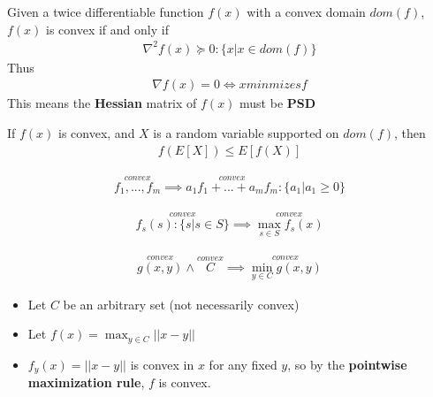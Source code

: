 \documentclass{article}
\begin{document}
\pagebreak
\begin{definition}
  Given a twice differentiable function $f(x)$ with a convex domain $dom(f)$,
  $f(x)$ is convex if and only if
  \begin{align}
    \nabla^2f(x)\succeq 0:\{x|x\in dom(f)\}
  \end{align}
  Thus
  \begin{align}
    \nabla f(x)=0\Longleftrightarrow x minmizes f
  \end{align}
  This means the \textbf{Hessian} matrix of $f(x)$ must be \textbf{PSD}
\end{definition}
\begin{theorem}
  If $f(x)$ is convex, and $X$ is a random variable supported on $dom(f)$, then
  \begin{align}
    f(E[X])\leq E[f(X)]
  \end{align}
\end{theorem}
\begin{headered_note}
  \begin{headered_note}
    \begin{align}
      \stackrel{convex}{f_1,...,f_m}\implies \stackrel{convex}{a_1f_1+...+a_mf_m}:\{a_1|a_1\geq 0\}
    \end{align}
  \end{headered_note}
  \begin{headered_note}
    \begin{align}
      \stackrel{convex}{f_s(s):\{s|s\in S\}}\implies \stackrel{convex}{\max_{s\in S}f_s(x)}
    \end{align}
  \end{headered_note}
  \begin{headered_note}
    \begin{align}
      \stackrel{convex}{g(x,y)}\wedge \stackrel{convex}{C}\implies \stackrel{convex}{\min_{y\in C}g(x,y)}
    \end{align}
  \end{headered_note}
\end{headered_note}
\begin{headered_note}
  \begin{itemize}
    \item Let $C$ be an arbitrary set (not necessarily convex)
    \item Let $f(x)=\max_{y\in C}||x-y||$
    \item $f_y(x)=||x-y||$ is convex in $x$ for any fixed $y$, so by the
          \textbf{pointwise maximization rule}, $f$ is convex.
  \end{itemize}
\end{headered_note}
\end{document}
